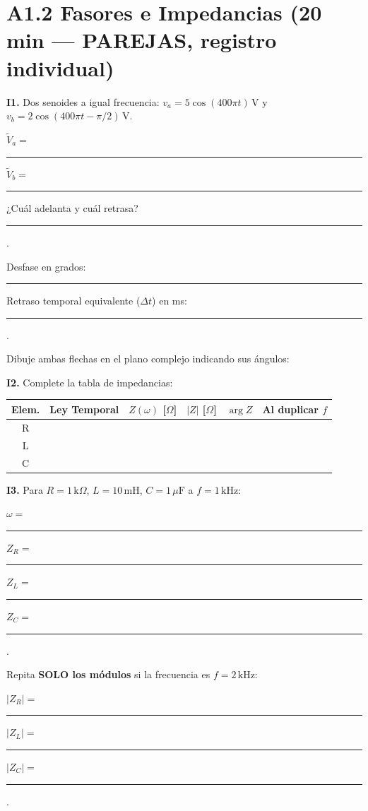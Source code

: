 \documentclass[11pt, a4paper]{article}
\begin{document}
\section*{A1.2 Fasores e Impedancias (20 min — PAREJAS, registro individual)}
\textbf{I1.} Dos senoides a igual frecuencia: $v_a = 5\cos(400\pi t)\,\text{V}$ y $v_b = 2\cos(400\pi t - \pi/2)\,\text{V}$. \par\vspace{0.1cm}
$\tilde{V}_a =$ \rule{2.5cm}{0.4pt} \quad $\tilde{V}_b =$ \rule{2.5cm}{0.4pt} \quad ¿Cuál adelanta y cuál retrasa? \rule{3.5cm}{0.4pt}. \par\vspace{0.1cm}
Desfase en grados: \rule{2cm}{0.4pt} \quad Retraso temporal equivalente ($\Delta t$) en ms: \rule{2cm}{0.4pt}. \par
Dibuje ambas flechas en el plano complejo indicando sus ángulos: \par\vspace{1.5cm}

\noindent\textbf{I2.} Complete la tabla de impedancias:
\vspace{0.1cm}

\renewcommand{\arraystretch}{1.5}
\noindent
\begin{tabularx}{\textwidth}{|c|X|c|c|c|X|}
\hline
\textbf{Elem.} & \textbf{Ley Temporal} & \textbf{$Z(\omega)$ [$\Omega$]} & \textbf{$\vert{}Z\vert{}$ [$\Omega$]} & \textbf{$\arg Z$} & \textbf{Al duplicar $f$} \\
\hline
R & & & & & \\
\hline
L & & & & & \\
\hline
C & & & & & \\
\hline
\end{tabularx}

\vspace{0.2cm}
\noindent\textbf{I3.} Para $R=1\,\text{k}\Omega$, $L=10\,\text{mH}$, $C=1\,\mu\text{F}$ a $f=1\,\text{kHz}$: \par
$\omega =$ \rule{3cm}{0.4pt} \quad $Z_R =$ \rule{2.5cm}{0.4pt} \quad $Z_L =$ \rule{2.5cm}{0.4pt} \quad $Z_C =$ \rule{2.5cm}{0.4pt}. \par
Repita \textbf{SOLO los módulos} si la frecuencia es $f=2\,\text{kHz}$: \par
$\vert{}Z_R\vert{}=$ \rule{1.5cm}{0.4pt} \quad $\vert{}Z_L\vert{}=$ \rule{1.5cm}{0.4pt} \quad $\vert{}Z_C\vert{}=$ \rule{1.5cm}{0.4pt}. \par\vspace{0.3cm}
\end{document}
